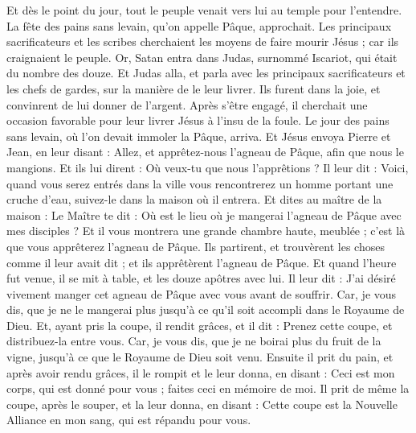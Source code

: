 \begin{multicols}{2}
Et dès le point du jour, tout le peuple venait vers lui au temple pour l'entendre.
\VerseOne{}La fête des pains sans levain, qu'on appelle Pâque, approchait.
Les principaux sacrificateurs et les scribes cherchaient les moyens de faire mourir Jésus ; car ils craignaient le peuple.
Or, Satan entra dans Judas, surnommé Iscariot, qui était du nombre des douze.
Et Judas alla, et parla avec les principaux sacrificateurs et les chefs de gardes, sur la manière de le leur livrer.
Ils furent dans la joie, et convinrent de lui donner de l'argent.
Après s’être engagé, il cherchait une occasion favorable pour leur livrer Jésus à l’insu de la foule.
Le jour des pains sans levain, où l’on devait immoler la Pâque, arriva.
Et Jésus envoya Pierre et Jean, en leur disant : Allez, et apprêtez-nous l'agneau de Pâque, afin que nous le mangions.
Et ils lui dirent : Où veux-tu que nous l'apprêtions ?
Il leur dit : Voici, quand vous serez entrés dans la ville vous rencontrerez un homme portant une cruche d'eau, suivez-le dans la maison où il entrera.
Et dites au maître de la maison : Le Maître te dit : Où est le lieu où je mangerai l'agneau de Pâque avec mes disciples ?
Et il vous montrera une grande chambre haute, meublée ; c’est là que vous apprêterez l'agneau de Pâque.
Ils partirent, et trouvèrent les choses comme il leur avait dit ; et ils apprêtèrent l'agneau de Pâque.
Et quand l'heure fut venue, il se mit à table, et les douze apôtres avec lui.
Il leur dit : J'ai désiré vivement manger cet agneau de Pâque avec vous avant de souffrir.
Car, je vous dis, que je ne le mangerai plus jusqu'à ce qu'il soit accompli dans le Royaume de Dieu.
Et, ayant pris la coupe, il rendit grâces, et il dit : Prenez cette coupe, et distribuez-la entre vous.
Car, je vous dis, que je ne boirai plus du fruit de la vigne, jusqu'à ce que le Royaume de Dieu soit venu.
Ensuite il prit du pain, et après avoir rendu grâces, il le rompit et le leur donna, en disant : Ceci est mon corps, qui est donné pour vous ; faites ceci en mémoire de moi.
Il prit de même la coupe, après le souper, et la leur donna, en disant : Cette coupe est la Nouvelle Alliance en mon sang, qui est répandu pour vous.

\end{multicols}
